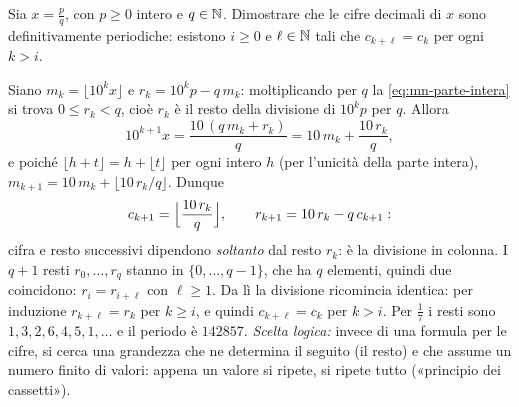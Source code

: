 \begin{esercizio}\label{es:decimali-periodici}
Sia $x=\frac pq$, con $p\ge0$ intero e $q\in\mathbb{N}$. Dimostrare che le cifre decimali di $x$
sono definitivamente periodiche: esistono $i\ge0$ e $\ell\in\mathbb{N}$ tali che
$c_{k+\ell}=c_{k}$ per ogni $k>i$.
\begin{soluzione}
Siano $m_{k}=\lfloor10^{k}x\rfloor$ e $r_{k}=10^{k}p-q\,m_{k}$: moltiplicando per $q$ la
\eqref{eq:mn-parte-intera} si trova $0\le r_{k}<q$, cioè $r_{k}$ è il resto della
divisione di $10^{k}p$ per $q$. Allora
\[
  10^{k+1}x=\frac{10\,(q\,m_{k}+r_{k})}{q}=10\,m_{k}+\frac{10\,r_{k}}{q},
\]
e poiché $\lfloor h+t\rfloor=h+\lfloor t\rfloor$ per ogni intero $h$ (per l'unicità della
parte intera), $m_{k+1}=10\,m_{k}+\lfloor10\,r_{k}/q\rfloor$. Dunque
\[
  c_{k+1}=\Bigl\lfloor\frac{10\,r_{k}}{q}\Bigr\rfloor, \qquad
  r_{k+1}=10\,r_{k}-q\,c_{k+1} :
\]
cifra e resto successivi dipendono \emph{soltanto} dal resto $r_{k}$: è la divisione in
colonna. I $q+1$ resti $r_{0},\dots,r_{q}$ stanno in $\{0,\dots,q-1\}$, che ha $q$
elementi, quindi due coincidono: $r_{i}=r_{i+\ell}$ con $\ell\ge1$. Da lì la divisione
ricomincia identica: per induzione $r_{k+\ell}=r_{k}$ per $k\ge i$, e quindi
$c_{k+\ell}=c_{k}$ per $k>i$. Per $\frac17$ i resti sono $1,3,2,6,4,5,1,\dots$ e il periodo
è $142857$. \emph{Scelta logica:} invece di una formula per le cifre, si cerca una
grandezza che ne determina il seguito (il resto) e che assume un numero finito di valori:
appena un valore si ripete, si ripete tutto («principio dei cassetti»).
\end{soluzione}
\end{esercizio}
